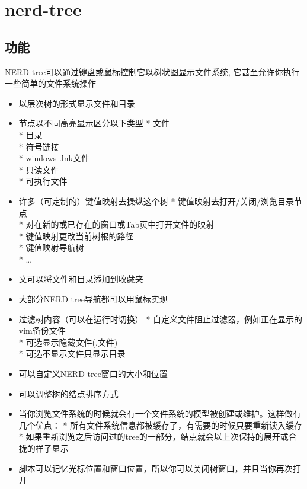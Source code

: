 \chapter{nerd-tree}

\section{功能}
NERD tree可以通过键盘或鼠标控制它以树状图显示文件系统,
它甚至允许你执行一些简单的文件系统操作
\begin{itemize}
    \item 以层次树的形式显示文件和目录
    \item 节点以不同高亮显示区分以下类型
        * 文件\\
        * 目录\\
        * 符号链接\\
        * windows .lnk文件\\
        * 只读文件\\
        * 可执行文件\\
    \item 许多（可定制的）键值映射去操纵这个树
        * 键值映射去打开/关闭/浏览目录节点\\
        * 对在新的或已存在的窗口或Tab页中打开文件的映射\\
        * 键值映射更改当前树根的路径\\
        * 键值映射导航树\\
        * \ldots\\
    \item 文可以将文件和目录添加到收藏夹
    \item 大部分NERD tree导航都可以用鼠标实现
    \item 过滤树内容（可以在运行时切换）
        * 自定义文件阻止过滤器，例如正在显示的vim备份文件\\
        * 可选显示隐藏文件(.文件)\\
        * 可选不显示文件只显示目录\\
    \item 可以自定义NERD tree窗口的大小和位置
    \item 可以调整树的结点排序方式
    \item 当你浏览文件系统的时候就会有一个文件系统的模型被创建或维护。这样做有几个优点：
        * 所有文件系统信息都被缓存了，有需要的时候只要重新读入缓存\\
        * 如果重新浏览之后访问过的tree的一部分，结点就会以上次保持的展开或合拢的样子显示\\
    \item 脚本可以记忆光标位置和窗口位置，所以你可以关闭树窗口，并且当你再次打开

\end{itemize}

